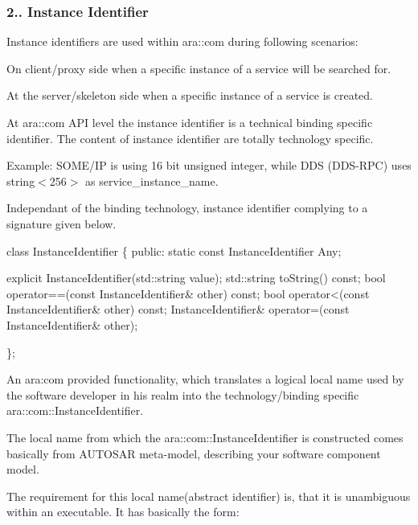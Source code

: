 \subsubsection*{2.. Instance Identifier}


\begin{DoxyItemize}
\item Instance identifiers are used within ara\+::com during following scenarios\+:
\begin{DoxyItemize}
\item On client/proxy side when a specific instance of a service will be searched for.
\item At the server/skeleton side when a specific instance of a service is created.
\end{DoxyItemize}
\item At ara\+::com A\+PI level the instance identifier is a technical binding specific identifier. The content of instance identifier are totally technology specific.
\item Example\+: S\+O\+M\+E/\+IP is using 16 bit unsigned integer, while D\+DS (D\+D\+S-\/\+R\+PC) uses string$<$256$>$ as service\+\_\+instance\+\_\+name.
\item Independant of the binding technology, instance identifier complying to a signature given below. 
\begin{DoxyCode}
  \textcolor{keyword}{class }InstanceIdentifier \{
  \textcolor{keyword}{public}:
  \textcolor{keyword}{static} \textcolor{keyword}{const} InstanceIdentifier Any;

  \textcolor{keyword}{explicit} InstanceIdentifier(std::string value);
  std::string toString() \textcolor{keyword}{const};
  \textcolor{keywordtype}{bool} operator==(\textcolor{keyword}{const} InstanceIdentifier& other) \textcolor{keyword}{const};
  \textcolor{keywordtype}{bool} operator<(\textcolor{keyword}{const} InstanceIdentifier& other) \textcolor{keyword}{const};
  InstanceIdentifier& operator=(\textcolor{keyword}{const} InstanceIdentifier& other);

\};
\end{DoxyCode}

\item An ara\+:com provided functionality, which translates a logical local name used by the software developer in his realm into the technology/binding specific ara\+::com\+::\+Instance\+Identifier.
\item The local name from which the ara\+::com\+::\+Instance\+Identifier is constructed comes basically from A\+U\+T\+O\+S\+AR meta-\/model, describing your software component model.
\item The requirement for this local name(abstract identifier) is, that it is unambiguous within an executable. It has basically the form\+:
\end{DoxyItemize}



